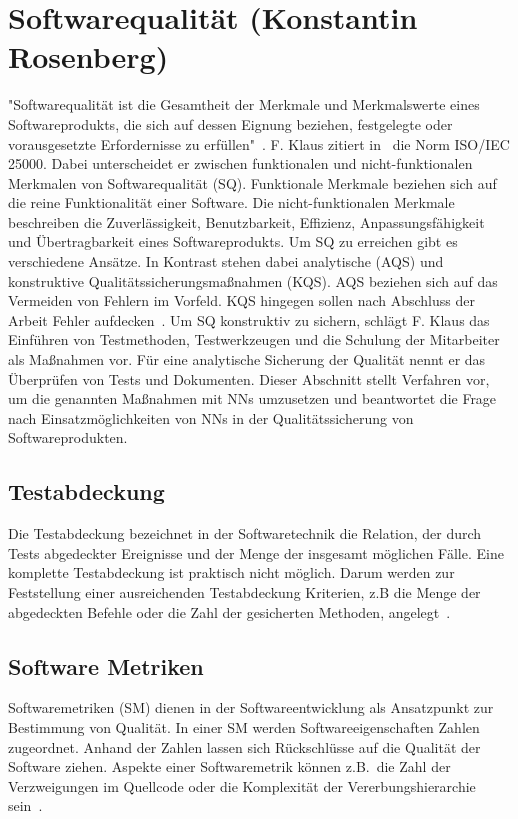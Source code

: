 \section{Softwarequalität (Konstantin Rosenberg)} \label{SQ}
"Softwarequalität ist die Gesamtheit der Merkmale und Merkmalswerte eines Softwareprodukts, die sich auf dessen Eignung beziehen,
festgelegte oder vorausgesetzte
Erfordernisse zu erfüllen"~\cite[p.~20]{Franz2015}.
F. Klaus zitiert in~\cite[p.~20]{Franz2015} die Norm ISO/IEC 25000. Dabei unterscheidet er zwischen funktionalen und nicht-funktionalen Merkmalen von Softwarequalität (SQ).
Funktionale Merkmale beziehen sich auf die reine Funktionalität einer Software. Die nicht-funktionalen Merkmale beschreiben die Zuverlässigkeit, Benutzbar\-keit, Effizienz, Anpassungsfähigkeit und Übertragbarkeit eines Softwareprodukts.
Um SQ zu erreichen gibt es verschiedene Ansätze. In Kontrast stehen dabei analytische (AQS) und konstruktive Qualitätssicherungsmaßnahmen (KQS). AQS beziehen sich auf das Vermeiden von Fehlern im Vorfeld. KQS hingegen sollen nach Abschluss der Arbeit Fehler aufdecken~\cite[p.~29]{Franz2015}. 
Um SQ konstruktiv zu sichern, schlägt F. Klaus das Einführen von Testmethoden, Testwerkzeugen und die Schulung der Mitarbeiter als Maßnahmen vor. Für eine analytische Sicherung der Qualität nennt er das Überprüfen von Tests und Dokumenten. Dieser Abschnitt stellt Verfahren vor, um die genannten Maßnahmen mit NNs umzusetzen und beantwortet die Frage nach Einsatzmöglichkeiten von NNs in der Qualitätssicherung von Softwareprodukten.

\subsection{Testabdeckung}
Die Testabdeckung bezeichnet in der Softwaretechnik die Relation, der durch Tests abgedeckter Ereignisse und der Menge der insgesamt möglichen Fälle. Eine komplette Testabdeckung ist praktisch nicht möglich. Darum werden zur Feststellung einer ausreichenden Testabdeckung Kriterien, z.B die Menge der abgedeckten Befehle oder die Zahl der gesicherten Methoden, angelegt~\cite{Antinyan2018}.

\subsection{Software Metriken}
Softwaremetriken (SM) dienen in der Softwareentwicklung als Ansatzpunkt zur Bestimmung von Qualität. In einer SM werden Softwareeigenschaften Zahlen zugeordnet. Anhand der Zahlen lassen sich Rückschlüsse auf die Qualität der Software ziehen. Aspekte einer Softwaremetrik können z.B.~die Zahl der Verzweigungen im Quellcode oder die Komplexität der Vererbungshierarchie sein~\cite[p.~3]{Committee1998}.

